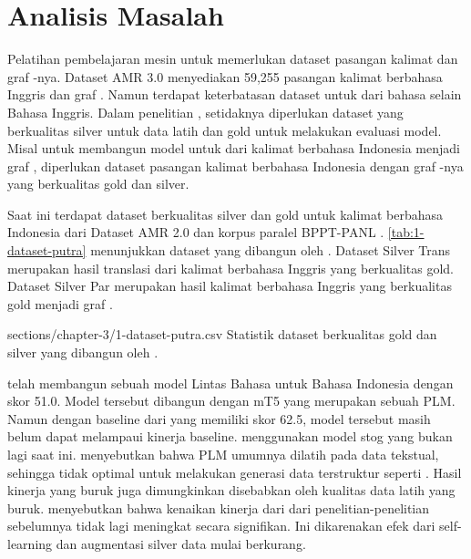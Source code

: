 \section{Analisis Masalah}

Pelatihan pembelajaran mesin untuk  \amrparsing{} memerlukan dataset  pasangan kalimat dan graf \AMR{}-nya.
Dataset AMR 3.0 menyediakan 59,255 pasangan kalimat berbahasa Inggris dan graf \AMR{}.
Namun terdapat keterbatasan dataset untuk  \amrparsing{} dari bahasa selain Bahasa Inggris.
Dalam penelitian \textcite{blloshmi2020}, setidaknya diperlukan dataset yang berkualitas silver untuk data latih dan gold untuk melakukan evaluasi model.
Misal untuk membangun model untuk \amrparsing{} dari kalimat berbahasa Indonesia menjadi graf \AMR{}, diperlukan dataset pasangan kalimat berbahasa Indonesia dengan graf \AMR{}-nya yang berkualitas gold dan silver.

Saat ini terdapat dataset berkualitas silver dan gold untuk kalimat berbahasa Indonesia dari Dataset AMR 2.0 dan korpus paralel BPPT-PANL .
\cref{tab:1-dataset-putra} menunjukkan dataset yang dibangun oleh \textcite{putra2022}.
Dataset Silver Trans merupakan hasil translasi dari kalimat berbahasa Inggris yang berkualitas gold.
Dataset Silver Par merupakan hasil  kalimat berbahasa Inggris yang berkualitas gold menjadi graf \AMR{}.

  {sections/chapter-3/1-dataset-putra.csv}
  {Statistik dataset berkualitas gold dan silver yang dibangun oleh \textcite{putra2022}.}

\textcite{putra2022} telah membangun sebuah model \AMR{}  Lintas Bahasa untuk Bahasa Indonesia dengan skor \SMATCH{} 51.0.
Model tersebut dibangun dengan \mwordem{} mT5 yang merupakan sebuah \gls{PLM}.
Namun dengan baseline dari  yang memiliki skor \SMATCH{} 62.5, model tersebut masih belum dapat melampaui kinerja baseline.
\textcite{putra2022} menggunakan model \gls{stog}  yang bukan lagi  \amrparsing{} saat ini.
\textcite{bai2022} menyebutkan bahwa \gls{PLM} umumnya dilatih pada data tekstual, sehingga tidak optimal untuk melakukan generasi data terstruktur seperti \AMR{}.
Hasil kinerja yang buruk juga dimungkinkan disebabkan oleh kualitas data latih yang buruk.
\textcite{lee2022} menyebutkan bahwa kenaikan kinerja dari \amrparsing{} dari penelitian-penelitian sebelumnya tidak lagi meningkat secara signifikan.
Ini dikarenakan efek dari self-learning dan augmentasi silver data mulai berkurang.
